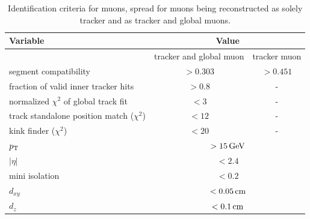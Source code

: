 \begin{table}[hbp]
 \centering
 \caption{Identification criteria for muons, spread for muons being reconstructed as solely tracker and as tracker and global muons.}
 \label{tab:muonID}
 \begin{tabular}{lcc}
  Variable                                   & \multicolumn{2}{c}{Value}                     \\\hline
                                             & tracker and global muon        & tracker muon \\\hline
  segment compatibility                      & $>0.303$                       & $>0.451$     \\
  fraction of valid inner tracker hits       & $>0.8$                         & -            \\
  normalized $\chi^2$ of global track fit    & $<3$                           & -            \\
  track standalone position match ($\chi^2$) & $<12$                          & -            \\
  kink finder ($\chi^2$)                     & $<20$                          & -            \\\hline
  $p_{\mathrm{T}}$                                      & \multicolumn{2}{c}{$>15\,\text{Ge\hspace{-.08em}V}$}                 \\
  $|\eta|$                                   & \multicolumn{2}{c}{$<2.4$}                    \\
  mini isolation                             & \multicolumn{2}{c}{$<0.2$}                    \\
  $d_{xy}$                                   & \multicolumn{2}{c}{$<0.05\,\text{cm}$}                \\
  $d_z$                                      & \multicolumn{2}{c}{$<0.1\,\text{cm}$}                 \\\hline
 \end{tabular}
 \vspace{\baselineskip}
\end{table}


